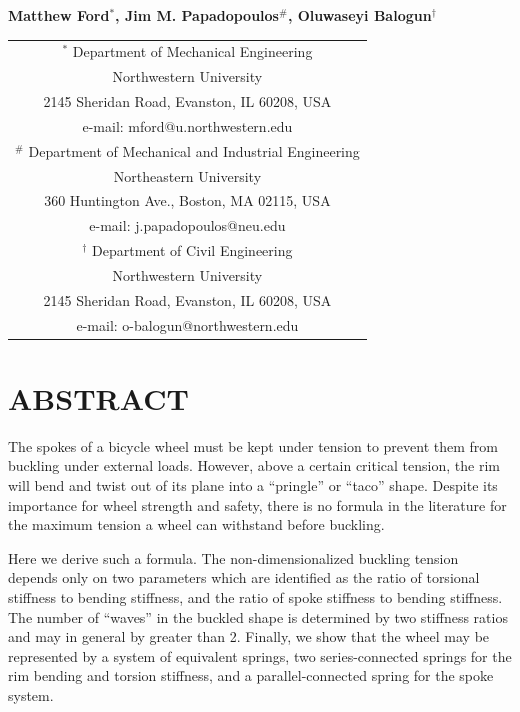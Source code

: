 \documentclass{bmd2016p}
\begin{document}
\begin{center}
\end{center}

\begin{center}
\normalsize{\bf{Matthew Ford$^{*}$, Jim M. Papadopoulos$^\#$, 
            Oluwaseyi Balogun$^\dag$}}
\end{center} 

\begin{center}
\begin{tabular}{c}
$^*$ Department of Mechanical Engineering\\
Northwestern University\\
2145 Sheridan Road, Evanston, IL 60208, USA\\
e-mail: mford@u.northwestern.edu\\[2.5ex]

$^\#$ Department of Mechanical and Industrial Engineering\\
Northeastern University\\
360 Huntington Ave., Boston, MA 02115, USA\\
e-mail: j.papadopoulos@neu.edu\\[2.5ex]

$^\dag$ Department of Civil Engineering\\
Northwestern University\\
2145 Sheridan Road, Evanston, IL 60208, USA\\
e-mail: o-balogun@northwestern.edu\\
\end{tabular}
\end{center}

\section*{ABSTRACT}
The spokes of a bicycle wheel must be kept under tension to prevent them from buckling under external loads. However, above a certain critical tension, the rim will bend and twist out of its plane into a ``pringle'' or ``taco'' shape. Despite its importance for wheel strength and safety, there is no formula in the literature for the maximum tension a wheel can withstand before buckling.

Here we derive such a formula. The non-dimensionalized buckling tension depends only on two parameters which are identified as the ratio of torsional stiffness to bending stiffness, and the ratio of spoke stiffness to bending stiffness. The number of ``waves'' in the buckled shape is determined by two stiffness ratios and may in general by greater than 2. Finally, we show that the wheel may be represented by a system of equivalent springs, two series-connected springs for the rim bending and torsion stiffness, and a parallel-connected spring for the spoke system.
\end{document}
